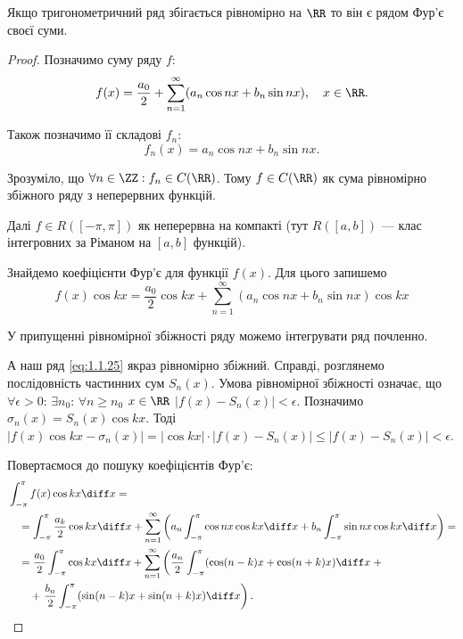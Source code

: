 \begin{theorem}
    Якщо тригонометричний ряд збігається рівномірно на $\RR$ то він є рядом Фур'є своєї суми.
\end{theorem}
\begin{proof}
    Позначимо суму ряду $f$:
    \begin{equation}
        f(x) = \frac{a_0}{2} + \sum_{n = 1}^\infty (a_n \cos n x + b_n \sin n x), \quad x \in \RR.
    \end{equation}

    Також позначимо її складові $f_n$:
    \begin{equation}
        f_n(x) = a_n \cos n x + b_n \sin n x.
    \end{equation}

    Зрозуміло, що $\forall n \in \ZZ: f_n \in C(\RR)$. Тому $f \in C(\RR)$ як сума рівномірно збіжного ряду з неперервних функцій. \medskip

    Далі $f \in R([-\pi, \pi])$ як неперервна на компакті (тут $R([a,b])$ --- клас інтегровних за Ріманом на $[a,b]$ функцій). \medskip

    Знайдемо коефіцієнти Фур'є для функції $f(x)$. Для цього запишемо
    \begin{equation}
        \label{eq:1.1.25}
        f(x) \cos kx = \frac{a_0}{2} \cos k x + \sum_{n = 1}^\infty (a_n \cos n x + b_n \sin n x) \cos k x
    \end{equation}

    \begin{proposition}
        У припущенні рівномірної збіжності ряду можемо інтегрувати ряд почленно.
    \end{proposition}
    
    А наш ряд \eqref{eq:1.1.25} якраз рівномірно збіжний. Справді, розглянемо послідовність частинних сум $S_n(x)$. Умова рівномірної збіжності означає, що $\forall \epsilon > 0$: $\exists n_0$: $\forall n \ge n_0$ $x \in \RR$ $|f(x) - S_n(x)| < \epsilon$. Позначимо $\sigma_n(x) = S_n(x) \cos k x$. Тоді $|f(x) \cos k x - \sigma_n(x)| = |\cos k x| \cdot |f(x) - S_n(x)| \le |f(x) - S_n(x)| < \epsilon$. \medskip

    Повертаємося до пошуку коефіцієнтів Фур'є:
    \begin{equation}
        \begin{aligned}
            & \int_{-\pi}^\pi f(x) \cos k x \diff x = \\
            &\quad = \int_{-\pi}^\pi \frac{a_k}{2} \cos k x \diff x + \sum_{n = 1}^\infty \left( a_n \int_{-\pi}^\pi \cos n x \cos k x \diff x + b_n \int_{-\pi}^\pi \sin n x \cos k x \diff x \right) = \\
            &\quad = \frac{a_0}{2} \int_{-\pi}^\pi \cos k x \diff x + \sum_{n = 1}^\infty \left( \frac{a_n}{2} \int_{-\pi}^\pi ( \cos (n - k) x + \cos (n + k) x ) \diff x \right. + \\
            &\qquad + \left. \frac{b_n}{2} \int_{-\pi}^\pi ( \sin (n - k) x + \sin (n + k) x ) \diff x \right).
        \end{aligned}
    \end{equation}


\end{proof}

